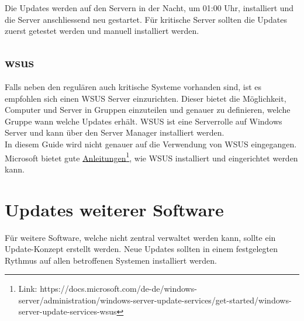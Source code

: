 Die Updates werden auf den Servern in der Nacht, um 01:00 Uhr, installiert und die Server anschliessend neu gestartet.
Für kritische Server sollten die Updates zuerst getestet werden und manuell installiert werden.

\subsection{\acrfull{wsus}}\label{subsec:wsus}
Falls neben den regulären auch kritische Systeme vorhanden sind, ist es empfohlen sich einen WSUS Server einzurichten.
Dieser bietet die Möglichkeit, Computer und Server in Gruppen einzuteilen und genauer zu definieren, welche Gruppe wann welche Updates erhält.
WSUS ist eine Serverrolle auf Windows Server und kann über den Server Manager installiert werden.\\

In diesem Guide wird nicht genauer auf die Verwendung von WSUS eingegangen.
Microsoft bietet gute \href{https://docs.microsoft.com/de-de/windows-server/administration/windows-server-update-services/get-started/windows-server-update-services-wsus}{Anleitungen}\footnote{Link: https://docs.microsoft.com/de-de/windows-server/administration/windows-server-update-services/get-started/windows-server-update-services-wsus}, wie WSUS installiert und eingerichtet werden kann.


\section{Updates weiterer Software}
Für weitere Software, welche nicht zentral verwaltet werden kann, sollte ein Update-Konzept erstellt werden.
Neue Updates sollten in einem festgelegten Rythmus auf allen betroffenen Systemen installiert werden.